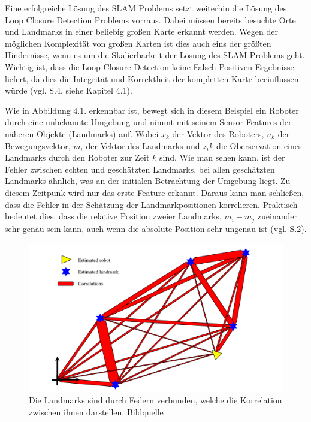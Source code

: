 Eine erfolgreiche Lösung des SLAM Problems setzt weiterhin die Lösung des \glqq Loop Closure Detection\grqq{} Problems vorraus. Dabei müssen bereits besuchte Orte und Landmarks in einer beliebig großen Karte erkannt werden. Wegen der möglichen Komplexität von großen Karten ist dies auch eins der größten Hindernisse, wenn es um die Skalierbarkeit der Lösung des SLAM Problems geht. Wichtig ist, dass die Loop Closure Detection keine Falsch-Positiven Ergebnisse liefert, da dies die Integrität und Korrektheit der kompletten Karte beeinflussen würde (vgl. \cite{ar_slam} S.4, siehe Kapitel 4.1).

Wie in Abbildung 4.1. erkennbar ist, bewegt sich in diesem Beispiel ein Roboter durch eine unbekannte Umgebung und nimmt mit seinem Sensor Features der näheren Objekte (Landmarks) auf. Wobei $x_k$ der Vektor des Roboters,  $u_k$ der Bewegungsvektor, $m_i$ der Vektor des Landmarks und $z_ik$ die Oberservation eines Landmarks durch den Roboter zur Zeit $k$ sind. Wie man sehen kann, ist der Fehler zwischen echten und geschätzten Landmarks, bei allen geschätzten Landmarks ähnlich, was an der initialen Betrachtung der Umgebung liegt. Zu diesem Zeitpunk wird nur das erste Feature erkannt. Daraus kann man schließen, dass die Fehler in der Schätzung der Landmarkpositionen korrelieren. Praktisch bedeutet dies, dass die relative Position zweier Landmarks, $m_i - m_j$ zueinander sehr genau sein kann, auch wenn die absolute Position sehr ungenau ist (vgl. \cite{slam} S.2).

\begin{figure}[H]
	\centering
	\includegraphics[scale=0.6]{slam_springs.png}
	\caption{Die Landmarks sind durch \glqq Federn\grqq{} verbunden, welche die Korrelation zwischen ihnen darstellen.  Bildquelle \cite{slam}}
\end{figure}  


